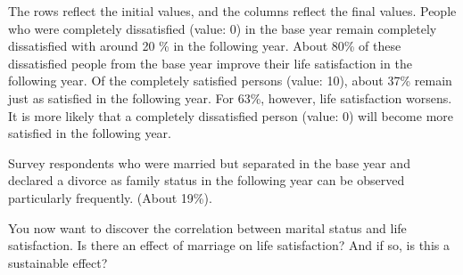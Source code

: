 \documentclass[letterpaper,10pt,openany,onesideH,english]{sphinxmanual}
\begin{document}
\begin{figure}[H]
\centering

\noindent{}
\end{figure}

The rows reflect the initial values, and the columns reflect the final values.
People who were completely dissatisfied (value: 0) in the base year remain completely dissatisfied with around 20 \% in the following year. About 80\% of these dissatisfied people from the base year improve their life satisfaction in the following year. Of the completely satisfied persons (value: 10), about 37\% remain just as satisfied in the following year. For 63\%, however, life satisfaction worsens. It is more likely that a completely dissatisfied person (value: 0) will become more satisfied in the following year.


%
\begin{sphinxVerbatim}[commandchars=\\\{\},numbers=left,firstnumber=1,stepnumber=1]
 
\end{sphinxVerbatim}

\begin{figure}[H]
\centering

\noindent{}
\end{figure}

Survey respondents who were married but separated in the base year and declared a divorce as family status in the following year can be observed particularly frequently. (About 19\%).


You now want to discover the correlation between marital status and life satisfaction. Is there an effect of marriage on life satisfaction? And if so, is this a sustainable effect?

\end{document}
